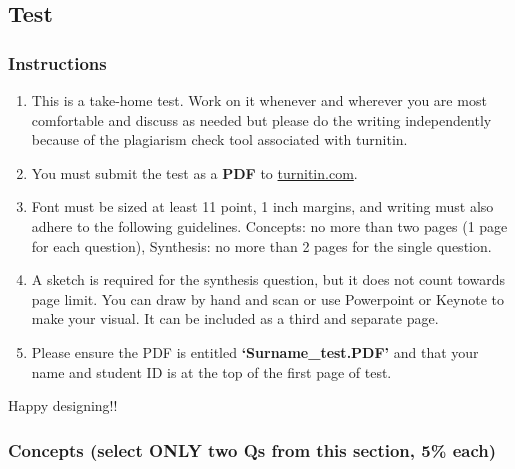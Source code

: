 \documentclass[
]{book}
\begin{document}
\hypertarget{test}{%
\subsection*{Test}\label{test}}

\hypertarget{instructions}{%
\subsubsection*{Instructions}\label{instructions}}

\begin{enumerate}
\def\labelenumi{\arabic{enumi}.}
\item
  This is a take-home test. Work on it whenever and wherever you are most comfortable and discuss as needed but please do the writing independently because of the plagiarism check tool associated with turnitin.
\item
  You must submit the test as a \textbf{PDF} to \href{http://www.turnitin.com}{turnitin.com}.\\
\item
  Font must be sized at least 11 point, 1 inch margins, and writing must also adhere to the following guidelines. Concepts: no more than two pages (1 page for each question), Synthesis: no more than 2 pages for the single question.
\item
  A sketch is required for the synthesis question, but it does not count towards page limit. You can draw by hand and scan or use Powerpoint or Keynote to make your visual. It can be included as a third and separate page.
\item
  Please ensure the PDF is entitled \textbf{`Surname\_test.PDF'} and that your name and student ID is at the top of the first page of test.
\end{enumerate}

Happy designing!!

\hypertarget{concepts-select-only-two-qs-from-this-section-5-each}{%
\subsubsection*{Concepts (select ONLY two Qs from this section, 5\% each)}\label{concepts-select-only-two-qs-from-this-section-5-each}}
\end{document}
